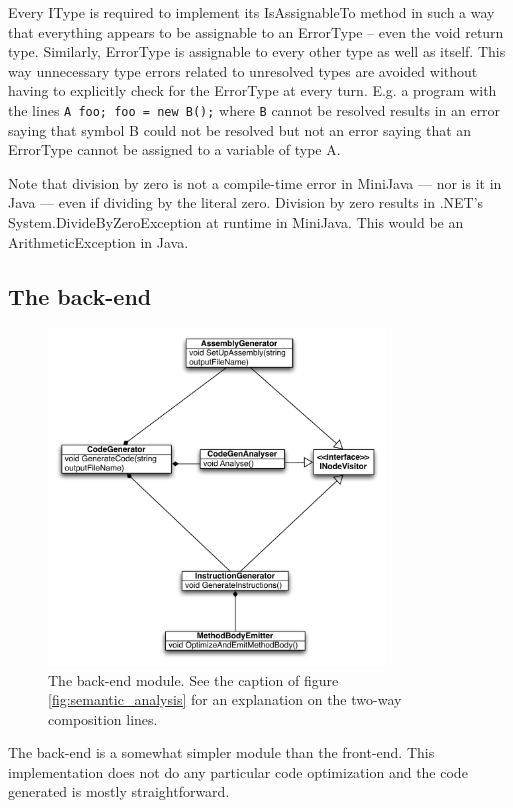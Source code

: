 \documentclass[a4paper,11pt]{article}
\begin{document}
Every IType is required to implement its IsAssignableTo method in such a way that everything appears to be assignable to an ErrorType -- even the void return type. Similarly, ErrorType is assignable to every other type as well as itself. This way unnecessary type errors related to unresolved types are avoided without having to explicitly check for the ErrorType at every turn. E.g. a program with the lines \verb,A foo; foo = new B();, where \verb,B, cannot be resolved results in an error saying that symbol B could not be resolved but not an error saying that an ErrorType cannot be assigned to a variable of type A.

Note that division by zero is not a compile-time error in MiniJava --- nor is it in Java --- even if dividing by the literal zero. Division by zero results in .NET's System.DivideByZeroException at runtime in MiniJava. This would be an ArithmeticException in Java.

\subsection{The back-end}

\begin{figure}[h!]
\centering
\includegraphics[width=0.8\textwidth]{backend.pdf}
\caption{The back-end module. See the caption of figure \ref{fig:semantic_analysis} for an explanation on the two-way composition lines.}
\end{figure}

The back-end is a somewhat simpler module than the front-end. This implementation does not do any particular code optimization and the code generated is mostly straightforward.
\end{document}

